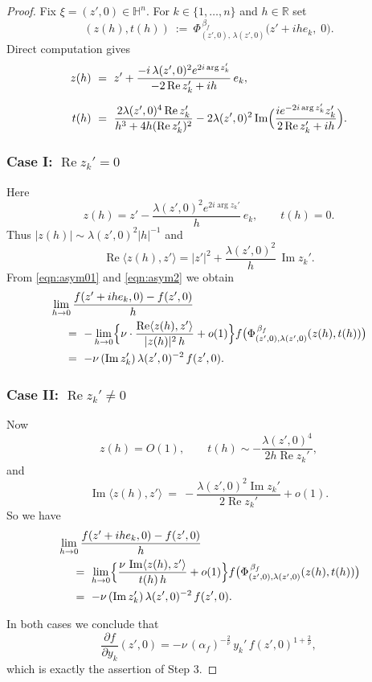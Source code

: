 \documentclass[reqno]{amsart}
\theoremstyle{definition}
\theoremstyle{remark}
\numberwithin{equation}{section}
\begin{document}
\begin{proof}
Fix \( \xi=(z',0)\in\mathbb{H}^n \). For \( k\in\{1,\dots,n\} \) and \( h\in\mathbb{R} \) set
\[
(z(h),t(h)) ~:=~ \Phi_{(z',0),\,\lambda(z',0)}^{\, \beta_f} \bigl(z' + i h e_k,\; 0\bigr).
\]
Direct computation gives
\begin{align*}
z(h) &~=~ z' + \frac{-i\,\lambda(z',0)^2 e^{2i\arg z_k'}}{-2\operatorname{Re} z_k' + i h}\,e_k, \\[2mm]
t(h) &~=~ \frac{2\lambda(z',0)^4\operatorname{Re} z_k'}{h^{3}+4h(\operatorname{Re} z_k')^{2}}
       - 2\lambda(z',0)^2\operatorname{Im} \Bigl(\frac{i e^{-2i\arg z_k'}z_k'}
       {2\operatorname{Re} z_k' + i h}\Bigr).
\end{align*}

\subsubsection*{Case I: \( \operatorname{Re} z_k' = 0 \)}
Here
\[
z(h)=z'-\frac{\lambda(z',0)^2 e^{2i\arg z_k'}}{h}\,e_k,\qquad t(h)=0 .
\]
Thus \( |z(h)|\sim\lambda(z',0)^2|h|^{-1} \) and
\[
\operatorname{Re}\langle z(h),z'\rangle = |z'|^2 + \frac{\lambda(z',0)^2}{h}\,\operatorname{Im} z_k'.
\]
From \eqref{eqn:asym01} and \eqref{eqn:asym2} we obtain
\begin{align*}
&\lim_{h\to0}\frac{f(z'+ i h e_k,0)-f(z',0)}{h} \\
&\quad ~=~ -\lim_{h\to0}\Bigl\{\nu\cdot\frac{\operatorname{Re}\langle z(h),z'\rangle}{|z(h)|^{2}\,h}+o(1)\Bigr\}
        f \bigl(\Phi_{(z',0),\lambda(z',0)}^{\, \beta_f} (z(h),t(h))\bigr) \\
&\quad ~=~ -\nu\,(\operatorname{Im} z_k')\,\lambda(z',0)^{-2}\,f(z',0).
\end{align*}

\subsubsection*{Case II: \( \operatorname{Re} z_k' \neq 0 \)}
Now
\[
z(h)=O(1),\qquad t(h)\sim -\frac{\lambda(z',0)^4}{2h\operatorname{Re} z_k'},
\]
and
\[
\operatorname{Im}\langle z(h),z'\rangle
~=~ -\frac{\lambda(z',0)^2\operatorname{Im} z_k'}{2\operatorname{Re} z_k'} + o(1).
\]
So we have
\begin{align*}
&\lim_{h\to0}\frac{f(z'+ i h e_k,0)-f(z',0)}{h} \\
&\quad ~=~ \lim_{h\to0}\Bigl\{\frac{\nu\,\operatorname{Im}\langle z(h),z'\rangle}{t(h)\,h}+o(1)\Bigr\}
        f \bigl(\Phi_{(z',0),\lambda(z',0)}^{\, \beta_f} (z(h),t(h))\bigr) \\
&\quad ~=~ -\nu\,(\operatorname{Im} z_k')\,\lambda(z',0)^{-2}\,f(z',0).
\end{align*}

In both cases we conclude that
\[
\frac{\partial f}{\partial y_k}(z',0)= -\nu\,(\alpha_f)^{-\frac{2}{\nu}}\,y_k'\,f(z',0)^{1+\frac{2}{\nu}},
\]
which is exactly the assertion of Step 3.
\end{proof}
\end{document}
